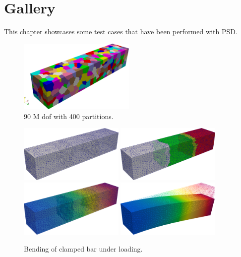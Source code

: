 \chapter{Gallery}

This chapter showcases some test cases that have been performed with PSD.

\begin{figure}
    \centering
    \includegraphics[width=0.5\textwidth]{./Images/400partmesh3d.png}
    \caption{90 M dof with 400 partitions.}
    \label{fig:90Mdof}
\end{figure}


\begin{figure}
	\centering
	\includegraphics[width=0.45\textwidth]{./Images/bar-1.png}    \includegraphics[width=0.45\textwidth]{./Images/bar-2.png}\\
	\includegraphics[width=0.45\textwidth]{./Images/bar-3.png}
	\includegraphics[width=0.45\textwidth]{./Images/bar-4.png}
	\caption{Bending of clamped bar under loading.}
	\label{fig:bar}
\end{figure}

